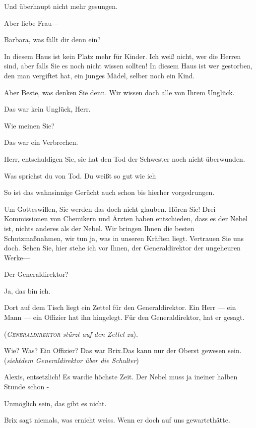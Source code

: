 \documentclass[
	final,
	a4paper,
	ngerman,
	mpinclude = true, %
	twoside = true,
	open = right,
	cleardoublepage = plain,
	DIV = 13,
	BCOR = 1cm,
	titlepage = firstiscover,
	]{scrbook}
\newcommand{\direction}[1]{(\textit{#1})}
\newcommand{\thecharacter}[1]{\textup{\textsc{#1}}\xspace}
\newcommand{\theBarbara}{\thecharacter{Barbara}}
\newcommand{\theJosef}{\thecharacter{Josef}}
\newcommand{\theGeneraldirektor}{\thecharacter{Generaldirektor}}
\newcommand{\theAlexis}{\thecharacter{Alexis}}
\newcommand{\character}[1]{\item[#1]}
\newcommand{\Barbara}{\character{\theBarbara}}
\newcommand{\Josef}{\character{\theJosef}}
\newcommand{\Generaldirektor}{\character{Direktor}}
\newcommand{\Alexis}{\character{\theAlexis}}
\begin{document}
\begin{play}
\Barbara
Und überhaupt nicht mehr gesungen.

\Generaldirektor
Aber liebe Frau---

\Josef
Barbara, was fällt dir denn ein?

\Barbara
In diesem Haus ist kein Platz mehr für Kinder. Ich weiß nicht, wer die Herren sind, aber falls Sie es noch nicht wissen sollten! In diesem Haus ist wer gestorben, den man vergiftet hat, ein junges Mädel, selber noch ein Kind.

\Generaldirektor
Aber Beste, was denken Sie denn. Wir wissen doch alle von Ihrem Unglück.

\Barbara
Das war kein Unglück, Herr.

\Generaldirektor
Wie meinen Sie?

\Barbara
Das war ein Verbrechen.

\Josef
Herr, entschuldigen Sie, sie hat den Tod der Schwester noch nicht überwunden.

\Barbara
Was sprichst du von Tod. Du weißt so gut wie ich%

\Alexis
So ist das wahnsinnige Gerücht auch schon bis hierher vorgedrungen.

\Generaldirektor
Um Gotteswillen, Sie werden das doch nicht glauben. Hören Sie! Drei Kommissionen von Chemikern und Ärzten haben entschieden, dass es der Nebel ist, nichts anderes als der Nebel. Wir bringen Ihnen die besten Schutzmaßnahmen, wir tun ja, was in unseren Kräften liegt. Vertrauen Sie uns doch. Sehen Sie, hier stehe ich vor Ihnen, der Generaldirektor der ungeheuren Werke---

\Josef
Der Generaldirektor?

\Generaldirektor
Ja, das bin ich.

\Josef
Dort auf dem Tisch liegt ein Zettel für den Generaldirektor. Ein Herr --- ein Mann --- ein Offizier hat ihn hingelegt. Für den Generaldirektor, hat er gesagt.

\direction{\theGeneraldirektor stürzt auf den Zettel zu}.

\Alexis
Wie? Was? Ein Offizier? Das war Brix.Das kann nur der Oberst gewesen sein. \direction{siehtdem Generaldirektor über die Schulter}

\Generaldirektor
Alexis, entsetzlich! Es wardie höchste Zeit. Der Nebel muss ja ineiner halben Stunde schon -

\Alexis
Unmöglich sein, das gibt es nicht.

\Generaldirektor
Brix sagt niemals, was ernicht weiss. Wenn er doch auf uns gewartethätte.


\end{play}
\end{document}
